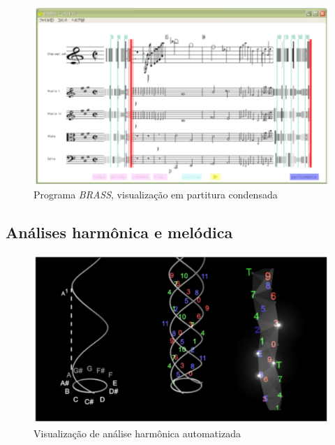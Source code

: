\documentclass{sciposter}
\begin{document}
\begin{multicols}{2}
\begin{center}

\begin{figure}[!h]
  \centering
  \includegraphics{./figs/watanabe-brass.pdf}
  \caption{Programa \textit{BRASS}, visualização em partitura condensada \cite{Watanabe2003}}
  \label{fig:label-figura}
\end{figure}

\end{center}

\subsection{Análises harmônica e melódica}

\begin{center}

\begin{figure}[!h]
  \centering
  \includegraphics{./figs/bain-realtime.pdf}
  \caption{Visualização de análise harmônica automatizada \cite{Bain2008}}
  \label{fig:label-figura}
\end{figure}


\end{center}
\end{multicols}
\end{document}
